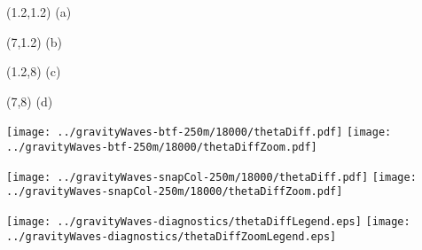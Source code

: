 \documentclass{article}
\begin{document}
\TPMargin{3pt}
\begin{textblock}{0.75}(1.2,1.2)
\normalsize
\centering
(a)
\end{textblock}
\begin{textblock}{0.75}(7,1.2)
\normalsize
\centering
(b)
\end{textblock}
\begin{textblock}{0.75}(1.2,8)
\normalsize
\centering
(c)
\end{textblock}
\begin{textblock}{0.75}(7,8)
\normalsize
\centering
(d)
\end{textblock}
\texttt{[image: ../gravityWaves-btf-250m/18000/thetaDiff.pdf]}
\hspace{0.1in}
\texttt{[image: ../gravityWaves-btf-250m/18000/thetaDiffZoom.pdf]}
\vspace*{0.1in}

\texttt{[image: ../gravityWaves-snapCol-250m/18000/thetaDiff.pdf]}
\hspace{0.1in}
\texttt{[image: ../gravityWaves-snapCol-250m/18000/thetaDiffZoom.pdf]}
\vspace*{0.1in}

\texttt{[image: ../gravityWaves-diagnostics/thetaDiffLegend.eps]}
\hspace{0.2in}
\texttt{[image: ../gravityWaves-diagnostics/thetaDiffZoomLegend.eps]}
\end{document}
